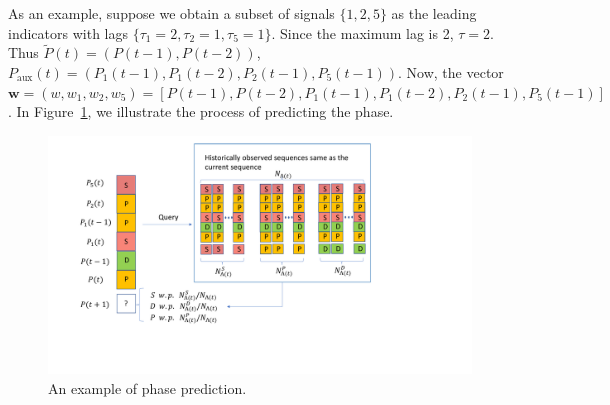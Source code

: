 \documentclass[conference,compsoc]{IEEEtran}
\newcommand{\Paux}{P_{\textrm{aux}}}
\begin{document}
As an example, suppose we obtain a subset of signals $\{1,2,5\}$ as the leading indicators with lags $\{\tau_1=2, \tau_2=1, \tau_5=1\}$. Since the maximum lag is 2, $\tau=2$. Thus $\tilde P(t) = (P(t-1), P(t-2))$, $\Paux(t) = (P_1(t-1), P_1(t-2), P_2(t-1), P_5(t-1))$. 
Now, the vector $\mathbf{w}=(w, w_1, w_2, w_5)=[P(t-1), P(t-2), P_1(t-1), P_1(t-2), P_2(t-1), P_5(t-1)]$. In Figure~\ref{fig:seq_ex}, we illustrate the process of predicting the phase. 
\begin{figure}
    \centering
    \includegraphics[width=.75\textwidth]{PI-BMA-IEEE-BigData2022_extended/figs/seq_freq_algo.pdf}
    \caption{An example of phase prediction.}
    \label{fig:seq_ex}
\end{figure}








\end{document}
